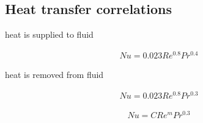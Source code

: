 \subsection{Heat transfer correlations}
    \begin{minipage}{0.32\linewidth}
        \vspace*{-1em}
        \centering
        \begin{scriptsize}
            heat is supplied to fluid
        \end{scriptsize}
        \begin{align*}
            Nu = 0.023 Re^0.8 Pr^0.4
        \end{align*}
    \end{minipage}
    \begin{minipage}{0.32\linewidth}
        \centering
        \vspace*{-1em}
        \begin{scriptsize}
            heat is removed from fluid
        \end{scriptsize}
        \begin{align*}
            Nu = 0.023 Re^0.8 Pr^0.3
        \end{align*}
    \end{minipage}
    \begin{minipage}{0.32\linewidth}
        \begin{align*}
            Nu = C Re^m Pr^0.3
        \end{align*}
    \end{minipage}